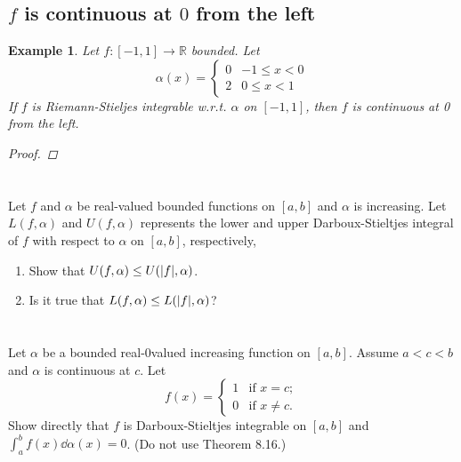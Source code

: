 \documentclass[]{article}
\newcommand{\R}{\mathbb{R}}
\newtheorem{example}{Example}
\begin{document}
\subsection{$f$ is continuous at $0$ from the left}
\begin{example}
    Let $f : [-1, 1] \to \R$ bounded.
    Let \[
        \alpha(x) = \begin{cases}
            0   & -1 \leq x < 0\\
            2   &  0 \leq x < 1
        \end{cases}
    \] If $f$ is Riemann-Stieljes integrable w.r.t. $\alpha$ on $[-1,1]$, then $f$ is continuous at 0 from the left.
    \begin{proof}

    \end{proof}
\end{example}












\newpage
\section{}
Let $f$ and $\alpha$ be real-valued bounded functions on $[a,b]$ and $\alpha$ is increasing. 
Let $L(f,\alpha)$ and $U(f,\alpha)$ represents the lower and upper Darboux-Stieltjes integral of $f$ with respect to $\alpha$ on $[a,b]$, respectively,\begin{enumerate}
    \item Show that $U(f,\alpha) \leq U(\abs{f},\alpha)$.
    \item Is it true that $L(f,\alpha) \leq L(\abs{f},\alpha)$?
\end{enumerate}









\newpage
\section{}
Let $\alpha$ be a bounded real-0valued increasing function on $[a,b]$. 
Assume $a < c < b$ and $\alpha$ is continuous at $c$. 
Let \[
    f(x) = \begin{cases}
        1   &\text{if } x = c;\\
        0   &\text{if } x \neq c.
    \end{cases}
\] Show directly that $f$ is Darboux-Stieltjes integrable on $[a,b]$ and $\int_{a}^{b} f(x) \dd{\alpha(x)} = 0$. 
(Do not use Theorem 8.16.)
\end{document}
